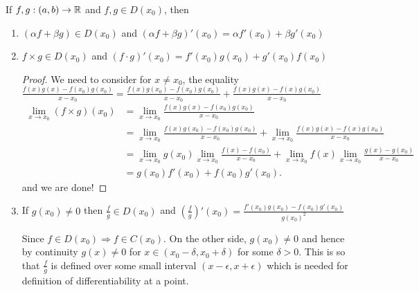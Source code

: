 \documentclass[a4paper]{article}
\begin{document}
\begin{prop}
  If $f,g: (a,b) \to \mathbb{R}$ and $f,g \in D(x_0)$, then 
  \begin{enumerate}
    \item $(\alpha f+ \beta g) \in D(x_0)$ and $(\alpha f + \beta g)' (x_0)= \alpha f' (x_0) + \beta g'(x_0) $ 
    \item $f \times g \in D(x_0)$ and $(f\cdot g)' \left(x_0 \right) = f'(x_0) g(x_0) + g'(x_0) f(x_0) $ 
\begin{proof}
  We need to consider for $x \neq x_0$, the equality $\frac{f(x) g(x) - f(x_0) g(x_0)}{x - x_0} = \frac{f(x) g(x_0) - f(x_0) g(x_0)}{x - x_0} + \frac{f(x) g(x) - f(x) g(x_0)}{x-x_0} 
$
  \begin{align*}
    \lim_{x \to x_0} (f \times g) (x_0) &= \lim_{x \to x_0} \frac{f(x) g(x) - f(x_0) g(x_0)}{x - x_0} \\ 
                                       &=  \lim_{x \to x_0}  \frac{f(x) g(x_0) - f(x_0) g(x_0)}{x - x_0} +  \lim_{x \to x_0} \frac{f(x) g(x) - f(x) g(x_0)}{x-x_0} \\
                                       &=  \lim_{x \to x_0}  g(x_0)  \lim_{x \to x_0} \frac{f(x) - f(x_0)}{x - x_0} +  \lim_{x \to x_0} f(x)  \lim_{x \to x_0} \frac{g(x) - g(x_0)}{x- x_0}    \\
                                       &= g(x_0) f'(x_0) + f(x_0) g'(x_0) 
  .\end{align*}
  and we are done!
 \end{proof}

    \item If $g(x_0) \neq 0$ then $\frac{f}{g} \in D(x_0)$ and $\left( \frac{f}{g} \right)' (x_0) = \frac{f'(x_0) g(x_0) - f(x_0) g'(x_0)}{g(x_0)^{2}} $ 
      \begin{note}
        Since $f \in D(x_0) \Rightarrow f \in C(x_0)$. On the other side, $g(x_0) \neq 0$ and hence by continuity $g(x) \neq 0$ for  $x \in (x_0  - \delta, x_0 + \delta)$ for some $\delta > 0$.  This is so that $\frac{f}{g}$ is defined over some small interval $(x - \epsilon, x + \epsilon)$ which is needed for definition of differentiability at a point. 
      \end{note}
  \end{enumerate}
\end{prop}
\end{document}
